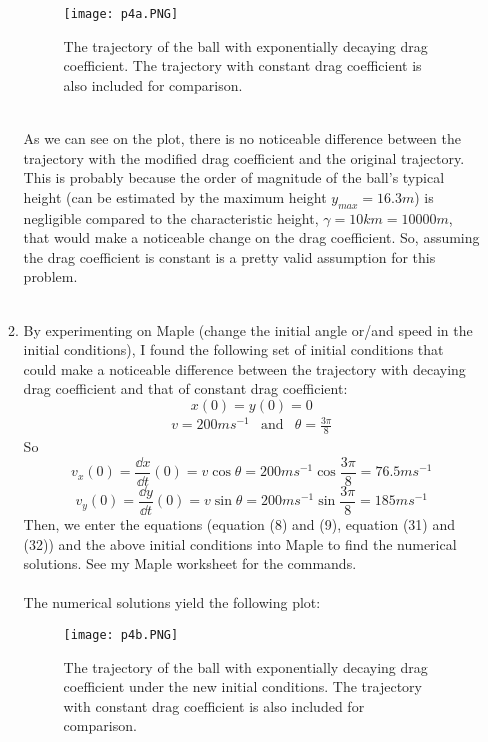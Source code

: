 \documentclass{article}
\begin{document}
\begin{enumerate}
\begin{enumerate}
\begin{figure}[ht]
        \centering
        \texttt{[image: p4a.PNG]}
        \caption{The trajectory of the ball with exponentially decaying drag coefficient. The trajectory with constant drag coefficient is also included for comparison. }
        \label{fig:label}
    \end{figure}\\
    As we can see on the plot, there is no noticeable difference between the trajectory with the modified drag coefficient
    and the original trajectory. This is probably because the order of magnitude of the ball's typical height (can be estimated by the maximum height \(y_{max}=16.3m\)) is negligible compared to the characteristic
    height, \(\gamma = 10km = 10000m\), that would make a noticeable change on the drag coefficient.
    So, assuming the drag coefficient is constant is a pretty valid assumption for this problem.
    \pagebreak \\ \\
    \item By experimenting on Maple (change the initial angle or/and speed in the initial conditions), I found the following
    set of initial conditions that could make a noticeable difference between the trajectory with decaying drag coefficient and that of constant drag coefficient:
    \begin{equation}
      x(0) = y(0) = 0
    \end{equation}
    \begin{eqnarray}
      v = 200ms^{-1} &\text{and} & \theta = \frac{3\pi}{8}
    \end{eqnarray}
    So
    \begin{equation}
      v_x(0)  = \frac{\dd x}{\dd t}(0) = v \cos\theta = 200ms^{-1}\cos\frac{3\pi}{8} = 76.5ms^{-1}
    \end{equation}
    \begin{equation}
      v_y(0)  = \frac{\dd y}{\dd t}(0) = v \sin\theta = 200ms^{-1}\sin\frac{3\pi}{8} = 185ms^{-1}
    \end{equation}
    Then, we enter the equations (equation (8) and (9), equation (31) and (32)) and the above initial conditions into Maple
    to find the numerical solutions. See my Maple worksheet for the commands. \\
    \\
    The numerical solutions yield the following plot:
    \begin{figure}[ht]
        \centering
        \texttt{[image: p4b.PNG]}
        \caption{The trajectory of the ball with exponentially decaying drag coefficient under the new initial conditions. The trajectory with constant drag coefficient is also included for comparison. }

\end{figure}
\end{enumerate}
\end{enumerate}
\end{document}
